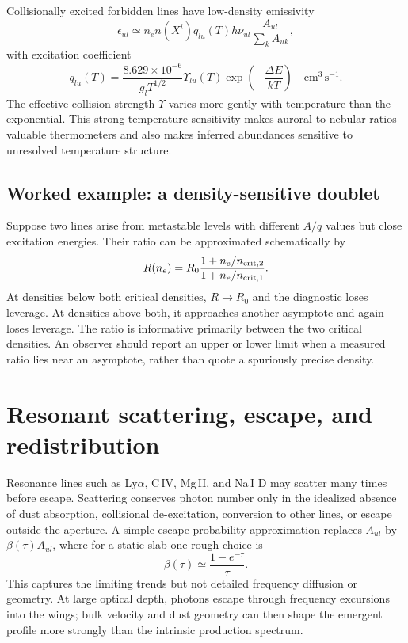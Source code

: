 Collisionally excited forbidden lines have low-density emissivity
\begin{equation}
 \epsilon_{ul}\simeq n_en(X^i)q_{lu}(T)h\nu_{ul}
 \frac{A_{ul}}{\sum_k A_{uk}},
 \label{eq:cel-emissivity}
\end{equation}
with excitation coefficient
\begin{equation}
 q_{lu}(T)=\frac{8.629\times10^{-6}}{g_lT^{1/2}}
 \Upsilon_{lu}(T)\exp\!\left(-\frac{\Delta E}{kT}\right)
 \quad \mathrm{cm^3\,s^{-1}}.
 \label{eq:collisional-rate-coefficient}
\end{equation}
The effective collision strength $\Upsilon$ varies more gently with temperature
than the exponential.  This strong temperature sensitivity makes auroral-to-nebular
ratios valuable thermometers and also makes inferred abundances sensitive to
unresolved temperature structure.

\subsection{Worked example: a density-sensitive doublet}

Suppose two lines arise from metastable levels with different $A/q$ values but close
excitation energies.  Their ratio can be approximated schematically by
\begin{equation}
 R(n_e)=R_0\frac{1+n_e/n_{{\rm crit},2}}
                     {1+n_e/n_{{\rm crit},1}}.
 \label{eq:doublet-density-schematic}
\end{equation}
At densities below both critical densities, $R\rightarrow R_0$ and the diagnostic
loses leverage.  At densities above both, it approaches another asymptote and again
loses leverage.  The ratio is informative primarily between the two critical
densities.  An observer should report an upper or lower limit when a measured ratio
lies near an asymptote, rather than quote a spuriously precise density.

\section{Resonant scattering, escape, and redistribution}

Resonance lines such as Ly$\alpha$, C\,IV, Mg\,II, and Na\,I D may scatter many
times before escape.  Scattering conserves photon number only in the idealized
absence of dust absorption, collisional de-excitation, conversion to other lines, or
escape outside the aperture.  A simple escape-probability approximation replaces
$A_{ul}$ by $\beta(\tau)A_{ul}$, where for a static slab one rough choice is
\begin{equation}
 \beta(\tau)\simeq\frac{1-e^{-\tau}}{\tau}.
 \label{eq:escape-probability}
\end{equation}
This captures the limiting trends but not detailed frequency diffusion or geometry.
At large optical depth, photons escape through frequency excursions into the wings;
bulk velocity and dust geometry can then shape the emergent profile more strongly
than the intrinsic production spectrum.

